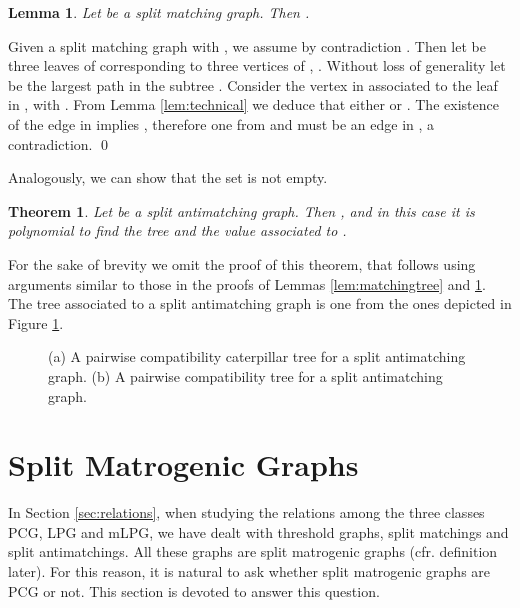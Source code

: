 \documentclass[dvipdfm]{llncs}
\newtheorem{Theorem}{Theorem}
\newtheorem{Lemma}{Lemma}
\begin{document}
\begin{Lemma}\label{lem:matching2}
Let  be a split matching graph. Then .
\end{Lemma}
\proof
Given a split matching graph  with , we assume by contradiction . Then let  be three leaves of  corresponding to three vertices of , . Without loss of generality let  be the largest path in the subtree . Consider the vertex  in  associated to the leaf  in , with . From Lemma \ref{lem:technical} we deduce that either  or . The existence of the edge  in  implies , therefore one from  and  must be an edge in , a contradiction. \qed


Analogously, we can show that the set  is not empty.

\begin{Theorem} \label{theo:splitantimatching}
Let  be a split antimatching graph. Then ,   and in this case it is polynomial to find the tree  and the value  associated to .
\end{Theorem}

For the sake of brevity we omit the proof of this theorem, that follows using arguments similar to those in the proofs of Lemmas \ref{lem:matchingtree} and \ref{lem:matching2}. The tree  associated to a split antimatching graph is one from the ones depicted in Figure \ref{fig:anti}.

\begin{figure}[!ht]
  \begin{center}
  \end{center}
\caption{\footnotesize{(a) A pairwise compatibility caterpillar tree for a split antimatching graph. (b) A pairwise compatibility tree for a split antimatching graph.}}
\label{fig:anti}
\end{figure}


\section{Split Matrogenic Graphs}\label{sec:matrogenic}


In Section \ref{sec:relations}, when studying the relations among the three classes PCG, LPG and mLPG, we have dealt with threshold graphs, split matchings and split antimatchings. All these graphs are split matrogenic graphs (cfr. definition later). For this reason, it is natural to ask whether split matrogenic graphs are PCG or not. This section is devoted to answer this question.
\end{document}
